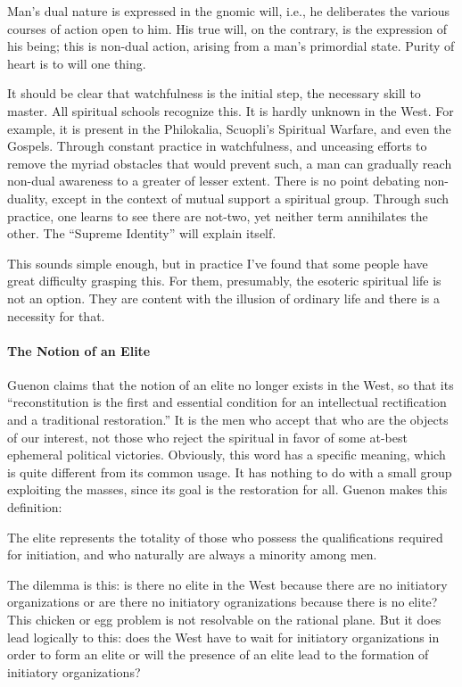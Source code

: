 Man's dual nature is expressed in the gnomic will, i.e., he deliberates the various courses of action open to him. His true will, on the contrary, is the expression of his being; this is non-dual action, arising from a man's primordial state. Purity of heart is to will one thing.

It should be clear that watchfulness is the initial step, the necessary skill to master. All spiritual schools recognize this. It is hardly unknown in the West. For example, it is present in the Philokalia, Scuopli's Spiritual Warfare, and even the Gospels. Through constant practice in watchfulness, and unceasing efforts to remove the myriad obstacles that would prevent such, a man can gradually reach non-dual awareness to a greater of lesser extent. There is no point debating non-duality, except in the context of mutual support a spiritual group. Through such practice, one learns to see there are not-two, yet neither term annihilates the other. The ``Supreme Identity'' will explain itself.

This sounds simple enough, but in practice I've found that some people have great difficulty grasping this. For them, presumably, the esoteric spiritual life is not an option. They are content with the illusion of ordinary life and there is a necessity for that.

\paragraph{The Notion of an Elite}


Guenon claims that the notion of an elite no longer exists in the West, so that its ``reconstitution is the first and essential condition for an intellectual rectification and a traditional restoration.'' It is the men who accept that who are the objects of our interest, not those who reject the spiritual in favor of some at-best ephemeral political victories. Obviously, this word has a specific meaning, which is quite different from its common usage. It has nothing to do with a small group exploiting the masses, since its goal is the restoration for all. Guenon makes this definition:

\begin{quotex} 
The elite represents the totality of those who possess the qualifications required for initiation, and who naturally are always a minority among men.
\end{quotex}


The dilemma is this: is there no elite in the West because there are no initiatory organizations or are there no initiatory ogranizations because there is no elite? This chicken or egg problem is not resolvable on the rational plane. But it does lead logically to this: does the West have to wait for initiatory organizations in order to form an elite or will the presence of an elite lead to the formation of initiatory organizations?

